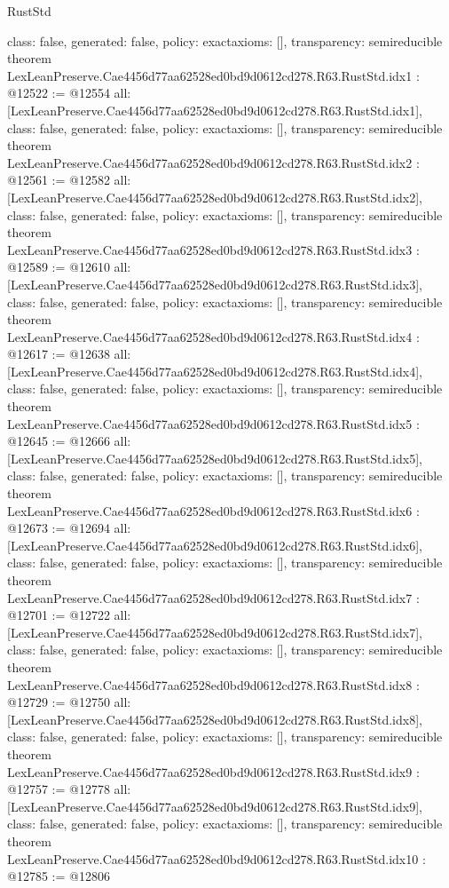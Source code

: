 \begin{lexlean}{RustStd}
\begin{coremodule}
{  class: false,
  generated: false,
  policy: exact{axioms: []},
  transparency: semireducible
}
theorem LexLeanPreserve.Cae4456d77aa62528ed0bd9d0612cd278.R63.RustStd.idx1 : @12522 := @12554 {
  all: [LexLeanPreserve.Cae4456d77aa62528ed0bd9d0612cd278.R63.RustStd.idx1],
  class: false,
  generated: false,
  policy: exact{axioms: []},
  transparency: semireducible
}
theorem LexLeanPreserve.Cae4456d77aa62528ed0bd9d0612cd278.R63.RustStd.idx2 : @12561 := @12582 {
  all: [LexLeanPreserve.Cae4456d77aa62528ed0bd9d0612cd278.R63.RustStd.idx2],
  class: false,
  generated: false,
  policy: exact{axioms: []},
  transparency: semireducible
}
theorem LexLeanPreserve.Cae4456d77aa62528ed0bd9d0612cd278.R63.RustStd.idx3 : @12589 := @12610 {
  all: [LexLeanPreserve.Cae4456d77aa62528ed0bd9d0612cd278.R63.RustStd.idx3],
  class: false,
  generated: false,
  policy: exact{axioms: []},
  transparency: semireducible
}
theorem LexLeanPreserve.Cae4456d77aa62528ed0bd9d0612cd278.R63.RustStd.idx4 : @12617 := @12638 {
  all: [LexLeanPreserve.Cae4456d77aa62528ed0bd9d0612cd278.R63.RustStd.idx4],
  class: false,
  generated: false,
  policy: exact{axioms: []},
  transparency: semireducible
}
theorem LexLeanPreserve.Cae4456d77aa62528ed0bd9d0612cd278.R63.RustStd.idx5 : @12645 := @12666 {
  all: [LexLeanPreserve.Cae4456d77aa62528ed0bd9d0612cd278.R63.RustStd.idx5],
  class: false,
  generated: false,
  policy: exact{axioms: []},
  transparency: semireducible
}
theorem LexLeanPreserve.Cae4456d77aa62528ed0bd9d0612cd278.R63.RustStd.idx6 : @12673 := @12694 {
  all: [LexLeanPreserve.Cae4456d77aa62528ed0bd9d0612cd278.R63.RustStd.idx6],
  class: false,
  generated: false,
  policy: exact{axioms: []},
  transparency: semireducible
}
theorem LexLeanPreserve.Cae4456d77aa62528ed0bd9d0612cd278.R63.RustStd.idx7 : @12701 := @12722 {
  all: [LexLeanPreserve.Cae4456d77aa62528ed0bd9d0612cd278.R63.RustStd.idx7],
  class: false,
  generated: false,
  policy: exact{axioms: []},
  transparency: semireducible
}
theorem LexLeanPreserve.Cae4456d77aa62528ed0bd9d0612cd278.R63.RustStd.idx8 : @12729 := @12750 {
  all: [LexLeanPreserve.Cae4456d77aa62528ed0bd9d0612cd278.R63.RustStd.idx8],
  class: false,
  generated: false,
  policy: exact{axioms: []},
  transparency: semireducible
}
theorem LexLeanPreserve.Cae4456d77aa62528ed0bd9d0612cd278.R63.RustStd.idx9 : @12757 := @12778 {
  all: [LexLeanPreserve.Cae4456d77aa62528ed0bd9d0612cd278.R63.RustStd.idx9],
  class: false,
  generated: false,
  policy: exact{axioms: []},
  transparency: semireducible
}
theorem LexLeanPreserve.Cae4456d77aa62528ed0bd9d0612cd278.R63.RustStd.idx10 : @12785 := @12806 {
}
\end{coremodule}
\end{lexlean}
